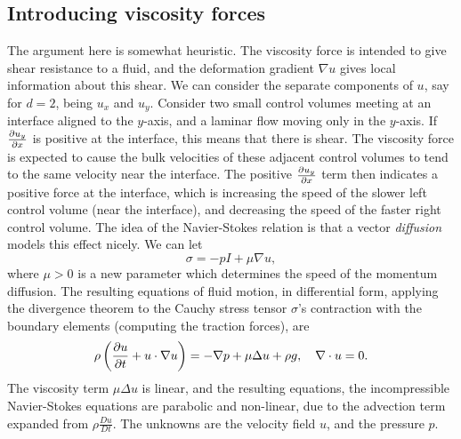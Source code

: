 \subsection{Introducing viscosity forces}
The argument here is somewhat heuristic.
The viscosity force is intended to give shear resistance to a fluid, and the deformation gradient $\nabla u$ gives local information about
this shear. We can consider the separate components of $u$, say for $d = 2$, being $u_x$ and $u_y$.
Consider two small control volumes meeting at an interface aligned to the $y$-axis, and a laminar flow moving
only in the $y$-axis. If $\frac{\partial u_y}{\partial x}$ is positive
at the interface, this means that there is shear. The viscosity force is expected to cause
the bulk velocities of these adjacent control volumes to tend to the same velocity near the interface.
The positive $\frac{\partial u_y}{\partial x}$ term then indicates a positive force at the interface, which is increasing
the speed of the slower left control volume (near the interface), and decreasing the speed of the faster right control volume.
The idea of the Navier-Stokes relation is that a vector \textit{diffusion} models this effect nicely. We can let
    $$\sigma = -pI + \mu \nabla u,$$
where $\mu > 0$ is a new parameter which determines the speed of the momentum diffusion.
The resulting equations of fluid motion, in differential form, applying the divergence theorem to the Cauchy stress tensor $\sigma$'s
contraction with the boundary elements (computing the traction forces), are
\begin{equation}\label{navier_stokes_final}
    \rho\left(\frac{\partial u}{\partial t} + u\cdot \nabla u\right) = - \nabla p + \mu\Delta u + \rho g,\quad \nabla\cdot u = 0.
\end{equation}
The viscosity term $\mu\Delta u$ is linear, and the resulting equations, the incompressible Navier-Stokes equations are parabolic and
non-linear, due to the advection term expanded from $\rho\frac{Du}{Dt}$.
The unknowns are the velocity field $u$, and the pressure $p$.

